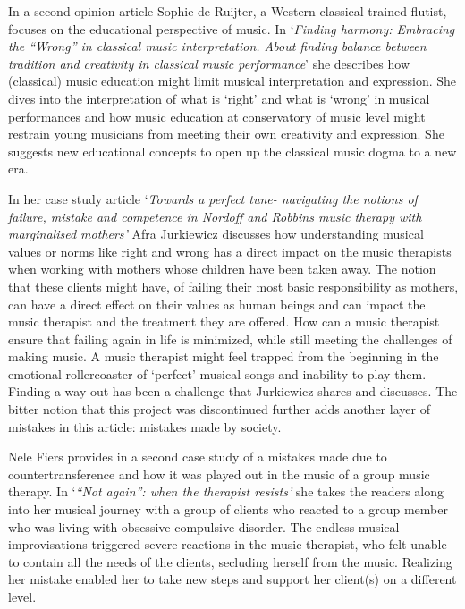 \documentclass[authordate, empirical, issue]{jote-new-article}
\begin{document}
In a second opinion article Sophie de Ruijter, a Western-classical trained flutist, focuses on the educational perspective of music. In ‘\emph{Finding harmony: Embracing the “Wrong” in classical music interpretation. About finding balance between tradition and creativity in classical music performance}' she describes how (classical) music education might limit musical interpretation and expression. She dives into the interpretation of what is ‘right' and what is ‘wrong' in musical performances and how music education at conservatory of music level might restrain young musicians from meeting their own creativity and expression. She suggests new educational concepts to open up the classical music dogma to a new era.



In her case study article ‘\emph{Towards a perfect tune- navigating the notions of failure, mistake and competence in Nordoff and Robbins music therapy with marginalised mothers' }Afra Jurkiewicz discusses how understanding musical values or norms like right and wrong has a direct impact on the music therapists when working with mothers whose children have been taken away. The notion that these clients might have, of failing their most basic responsibility as mothers, can have a direct effect on their values as human beings and can impact the music therapist and the treatment they are offered. How can a music therapist ensure that failing again in life is minimized, while still meeting the challenges of making music. A music therapist might feel trapped from the beginning in the emotional rollercoaster of ‘perfect' musical songs and inability to play them. Finding a way out has been a challenge that Jurkiewicz shares and discusses. The bitter notion that this project was discontinued further adds another layer of mistakes in this article: mistakes made by society.



Nele Fiers provides in a second case study of a mistakes made due to countertransference and how it was played out in the music of a group music therapy. In ‘\emph{“Not again”: when the therapist resists'} she takes the readers along into her musical journey with a group of clients who reacted to a group member who was living with obsessive compulsive disorder. The endless musical improvisations triggered severe reactions in the music therapist, who felt unable to contain all the needs of the clients, secluding herself from the music. Realizing her mistake enabled her to take new steps and support her client(s) on a different level.
\end{document}

